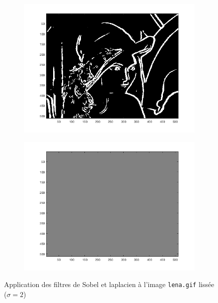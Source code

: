 \documentclass[a4paper]{article}
\begin{document}
\begin{figure}[H]
    \centering
    \begin{subfigure}[c]{0.46\textwidth}
        \centering
        \includegraphics[width=\textwidth]{images/lena_gauss_sobel2.png}
    \end{subfigure}
    \begin{subfigure}[c]{0.46\textwidth}
        \centering
        \includegraphics[width=\textwidth]{images/lena_gauss_laplacien2.png}
    \end{subfigure}
    \caption{Application des filtres de Sobel et laplacien à l'image
    \texttt{lena.gif} lissée ($\sigma=2$)}
    \label{fig:lena-lissage}
\end{figure}
\end{document}

